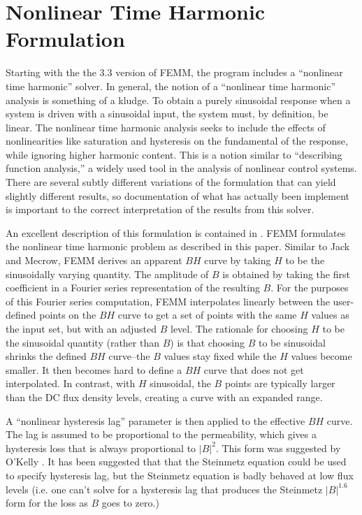 \documentclass[12pt]{report}
\begin{document}
\section{Nonlinear Time Harmonic Formulation} \label{nonlineartimeharmonicappendix}

Starting with the the 3.3 version of FEMM, the program includes a
``nonlinear time harmonic'' solver. In general, the notion of a
``nonlinear time harmonic'' analysis is something of a kludge. To
obtain a purely sinusoidal response when a system is driven with a
sinusoidal input, the system must, by definition, be linear. The
nonlinear time harmonic analysis seeks to include the effects of
nonlinearities like saturation and hysteresis on the fundamental of
the response, while ignoring higher harmonic content. This is a
notion similar to ``describing function analysis,'' a widely used
tool in the analysis of nonlinear control systems. There are
several subtly different variations of the formulation that can
yield slightly different results, so documentation of what has
actually been implement is important to the correct interpretation
of the results from this solver.

An excellent description of this formulation is contained in
\cite{jackmecrow}. FEMM formulates the nonlinear time harmonic
problem as described in this paper. Similar to Jack and Mecrow,
FEMM derives an apparent $BH$ curve by taking $H$ to be the
sinusoidally varying quantity. The amplitude of $B$ is obtained by
taking the first coefficient in a Fourier series representation of
the resulting $B$. For the purposes of this Fourier series
computation, FEMM interpolates linearly between the user-defined
points on the $BH$ curve to get a set of points with the same $H$
values as the input set, but with an adjusted $B$ level. The
rationale for choosing $H$ to be the sinusoidal quantity (rather
than $B$) is that choosing $B$ to be sinusoidal shrinks the defined
$BH$ curve--the $B$ values stay fixed while the $H$ values become
smaller. It then becomes hard to define a $BH$ curve that does not
get interpolated. In contrast, with $H$ sinusoidal, the $B$ points
are typically larger than the DC flux density levels, creating a
curve with an expanded range.

A ``nonlinear hysteresis lag'' parameter is then applied to the
effective $BH$ curve. The lag is assumed to be proportional to the
permeability, which gives a hysteresis loss that is always
proportional to $|B|^2$. This form was suggested by O'Kelly \cite{okelly}.
It has been suggested that that the Steinmetz
equation could be used to specify hysteresis lag, but the Steinmetz
equation is badly behaved at low flux levels (i.e. one can't solve
for a hysteresis lag that produces the Steinmetz $|B|^{1.6}$ form
for the loss as $B$ goes to zero.)
\end{document}
